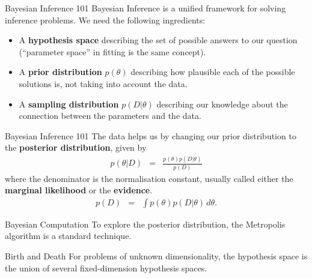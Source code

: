\begin{frame}[t]{Bayesian Inference 101}
Bayesian Inference is a unified framework for solving inference problems.
We need the following ingredients:

\begin{itemize}
\setlength{\itemsep}{20pt}
\item A {\bf hypothesis space} describing the set of possible answers to our
question (``parameter space'' in fitting is the same concept).
\item A {\bf prior distribution} $p(\theta)$ describing how plausible
each of the possible solutions is, not taking into account the data.
\item A {\bf sampling distribution} $p(D | \theta)$ describing our knowledge
about the connection between the parameters and the data.
\end{itemize}

\end{frame}


\begin{frame}[t]{Bayesian Inference 101}
The data helps us by changing our prior distribution to the {\bf posterior
distribution}, given by
\begin{eqnarray}
p(\theta | D) &=& \frac{p(\theta) p(D|\theta)}{p(D)}
\end{eqnarray}
where the denominator is the normalisation constant, usually called either
the {\bf marginal likelihood} or the {\bf evidence}.
\begin{eqnarray}
p(D) &=& \int p(\theta)p(D|\theta) \, d\theta.
\end{eqnarray}

\end{frame}


\begin{frame}[t]{Bayesian Computation}
To explore the posterior distribution, the Metropolis algorithm is a standard
technique.


\end{frame}

\begin{frame}[t]{Birth and Death}
For problems of unknown dimensionality, the hypothesis space is the union
of several fixed-dimension hypothesis spaces.


\end{frame}



